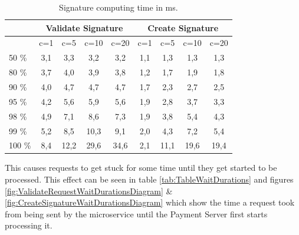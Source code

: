 \documentclass[a4paper,12pt]{scrartcl}
\begin{document}
\begin{table}[H]
    \centering
    \label{tab:TableSignatureTimes}
    \begin{tabular}{|l|c|c|c|c|c|c|c|c|}
        \hline
        & \multicolumn{4}{|c|}{Validate Signature} & \multicolumn{4}{|c|}{Create Signature}\\
        \hline
        &   c=1   & c=5 &   c=10 & c=20 &   c=1   & c=5 &   c=10 & c=20\\
        \hline
        50 \%   &   3,1     &   3,3 &   3,2 &   3,2 &   1,1 &   1,3 &   1,3 &   1,3\\
        \hline
        80 \%   &   3,7     &   4,0 &   3,9 &   3,8 &   1,2 &   1,7 &   1,9 &   1,8\\
        \hline
        90 \%   &   4,0     &   4,7 &   4,7 &   4,7 &   1,7 &   2,3 &   2,7 &   2,5\\
        \hline
        95 \%   &   4,2     &   5,6 &   5,9 &   5,6 &   1,9 &   2,8 &   3,7 &   3,3\\
        \hline
        98 \%   &   4,9     &   7,1 &   8,6 &   7,3 &   1,9 &   3,8 &   5,4 &   4,3\\
        \hline
        99 \%   &   5,2     &   8,5 &   10,3 &   9,1 &  2,0 &   4,3 &   7,2 &   5,4\\
        \hline
        100 \%  &   8,4     &   12,2 &   29,6 &   34,6 & 2,1 &  11,1 &  19,6 &  19,4\\
        \hline
    \end{tabular}
    \caption{Signature computing time in ms.}
\end{table}

This causes requests to get stuck for some time until they get started to be processed. This effect can be seen in table \ref{tab:TableWaitDurations} and figures \ref{fig:ValidateRequestWaitDurationsDiagram} \& \ref{fig:CreateSignatureWaitDurationsDiagram} which show the time a request took from being sent by the microservice until the Payment Server first starts processing it.\\
\end{document}
